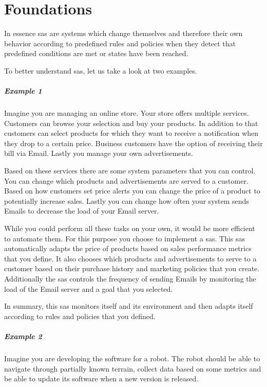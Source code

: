 \section{Foundations}
\label{ch:Foundations}

\noindent In essence \acrshort{sas} are systems which change themselves and therefore their own behavior
according to predefined rules and policies when they detect that predefined conditions are met or states have been reached.

\noindent To better understand \acrshort{sas}, let us take a look at two examples.

\subparagraph*{Example 1}
Imagine you are managing an online store.
Your store offers multiple services.
Customers can browse your selection and buy your products.
In addition to that customers can select products for which they want to receive a notification when they drop to a certain price.
Business customers have the option of receiving their bill via Email.
Lastly you manage your own advertisements.

\noindent Based on these services there are some system parameters that you can control.
You can change which products and advertisements are served to a customer.
Based on how customers set price alerts you can change the price of a product to potentially increase sales.
Lastly you can change how often your system sends Emails to decrease the load of your Email server.

\noindent While you could perform all these tasks on your own, it would be more efficient to automate them.
For this purpose you choose to implement a \acrshort{sas}.
This \acrshort{sas} automatically adapts the price of products based on sales performance metrics that you define.
It also chooses which products and advertisements to serve to a customer based on their purchase history
and marketing policies that you create.
Additionally the \acrshort{sas} controls the frequency of sending Emails by monitoring the load of the Email server
and a goal that you selected.

\noindent In summary, this \acrshort{sas} monitors itself and its environment
and then adapts itself according to rules and policies that you defined.

\subparagraph*{Example 2}
Imagine you are developing the software for a robot.
The robot should be able to navigate through partially known terrain,
collect data based on some metrics and be able to update its software when a new version is released.

